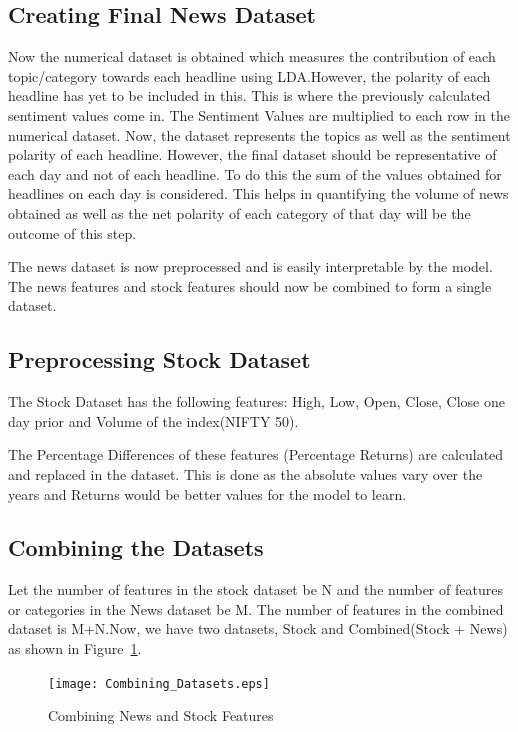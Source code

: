 \documentclass[preprint,12pt]{elsarticle}
\begin{document}
\subsection{Creating Final News Dataset}

Now the numerical dataset is obtained which measures the contribution of each topic/category towards each headline using LDA.However, the polarity of each headline has yet to be included in this. This is where the previously calculated sentiment values come in. 
The Sentiment Values are multiplied to each row in the numerical dataset.
Now, the dataset represents the topics as well as the sentiment polarity of each headline.
However, the final dataset should be representative of each day and not of each headline. To do this the sum of the values obtained for headlines on each day is considered. This helps in quantifying the volume of news obtained as well as the net polarity of each category of that day will be the outcome of this step.

The news dataset is now preprocessed and is easily interpretable by the model. The news features and stock features should now be combined to form a single dataset. 

\subsection{Preprocessing Stock Dataset}

The Stock Dataset has the following features: High, Low, Open, Close, Close one day prior and Volume of the index(NIFTY 50).


The Percentage Differences of these features (Percentage Returns) are calculated and replaced in the dataset. This is done as the absolute values vary over the years and Returns would be better values for the model to learn.

\subsection{Combining the Datasets}

Let the number of features in the stock dataset be N and the number of features or categories in the News dataset be M. The number of features in the combined dataset is M+N.Now, we have two datasets, Stock and Combined(Stock + News) as shown in Figure~\ref{fig:combining_datasets}.

\begin{figure}[H]
\centering
\texttt{[image: Combining\_Datasets.eps]}
\caption{\label{fig:combining_datasets} Combining News and Stock Features}
\end{figure}
\end{document}
